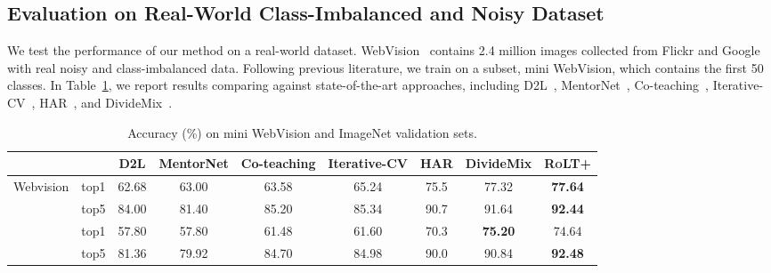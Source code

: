 \documentclass{article}
\def\algo{{\textsc{RoLT}}}
\begin{document}
\subsection{Evaluation on Real-World Class-Imbalanced and Noisy Dataset}
We test the performance of our method on a real-world dataset. WebVision~\cite{webvision} contains 2.4 million images collected from Flickr and Google with real noisy and class-imbalanced data. Following previous literature, we train on a subset, mini WebVision, which contains the first 50 classes. In Table~\ref{exp:webvision}, we report results comparing against state-of-the-art approaches, including D2L~\cite{ma2018dimensionality}, MentorNet~\cite{jiang2018mentornet}, Co-teaching~\cite{han2018co}, Iterative-CV~\cite{chen2019understanding}, HAR~\cite{cao2021heteroskedastic}, and DivideMix~\cite{li2020dividemix}. 

\begin{table}[htbp]
\centering
\begin{center}
\begin{tabular}{l|c|c|c|c|c|c|c|c}
\toprule
& & D2L & MentorNet & Co-teaching & Iterative-CV & HAR & DivideMix & \textbf{\algo+} \\
\midrule
\multirow{2}{*}{Webvision} & top1 & 62.68 & 63.00 & 63.58 & 65.24 & 75.5 & 77.32 & \textbf{77.64} \\
                           & top5 & 84.00 & 81.40 & 85.20 & 85.34 & 90.7 & 91.64 & \textbf{92.44}\\
\hline
\rule{0pt}{2.2ex} \multirow{2}{*}{ImageNet} & top1 & 57.80 & 57.80 & 61.48 & 61.60 & 70.3 & \textbf{75.20} & 74.64\\
                           & top5 & 81.36 & 79.92 & 84.70 & 84.98 & 90.0 & 90.84 & \textbf{92.48}\\
\bottomrule
\end{tabular}
\end{center}
\caption{Accuracy (\%) on mini WebVision and ImageNet validation sets.}\label{exp:webvision}
\end{table}
\end{document}
